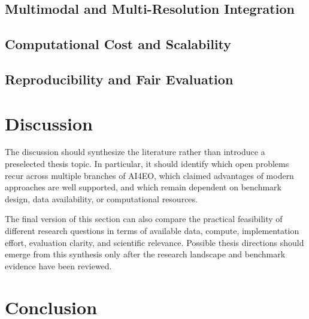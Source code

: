 \documentclass[
    11pt,
    a4paper,
    parskip=half,
    bibliography=totoc,
    numbers=noenddot
]{scrartcl}
\begin{document}
\subsection{Multimodal and Multi-Resolution Integration}


\subsection{Computational Cost and Scalability}


\subsection{Reproducibility and Fair Evaluation}


\section{Discussion}

The discussion should synthesize the literature rather than introduce a
preselected thesis topic. In particular, it should identify which open
problems recur across multiple branches of AI4EO, which claimed
advantages of modern approaches are well supported, and which remain
dependent on benchmark design, data availability, or computational
resources.

The final version of this section can also compare the practical
feasibility of different research questions in terms of available data,
compute, implementation effort, evaluation clarity, and scientific
relevance. Possible thesis directions should emerge from this synthesis
only after the research landscape and benchmark evidence have been
reviewed.

\section{Conclusion}
\end{document}
